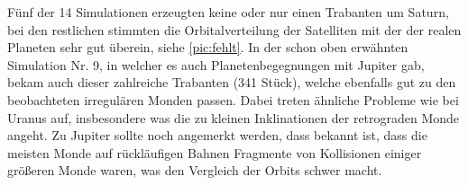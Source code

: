 \documentclass[10pt,a4paper,twoside]{article}
\begin{document}
Fünf der 14 Simulationen erzeugten keine oder nur einen Trabanten um Saturn, bei den restlichen stimmten die Orbitalverteilung der Satelliten mit der der realen Planeten sehr gut überein, siehe \ref{pic:fehlt}\cite{Nesvorny2007}. %
In der schon oben erwähnten Simulation Nr. 9, in welcher es auch Planetenbegegnungen mit Jupiter gab, bekam auch dieser zahlreiche Trabanten (341 Stück), welche ebenfalls gut zu den beobachteten irregulären Monden passen. Dabei treten ähnliche Probleme wie bei Uranus auf, insbesondere was die zu kleinen Inklinationen der retrograden Monde angeht.
Zu Jupiter sollte noch angemerkt werden, dass bekannt ist, dass die meisten Monde auf rückläufigen Bahnen Fragmente von Kollisionen einiger größeren Monde waren, was den Vergleich der Orbits schwer macht\cite{Nesvorny2007}. %
\end{document}
